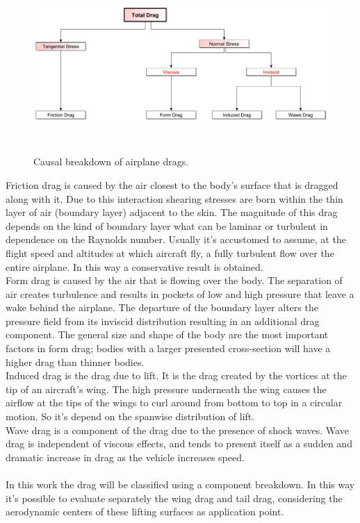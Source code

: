 \begin{figure}[H]
\centering
{\includegraphics[height=6cm]{Immagini/dragcausal.pdf}} 
\caption{Causal breakdown of airplane drags.}
\end{figure}


Friction drag is caused by the air closest to the body’s surface that is dragged along with it. Due to this interaction shearing stresses are born within the thin layer of air (boundary layer) adjacent to the skin. The magnitude of this drag depends on the kind of boundary layer what can be laminar or turbulent in dependence on the Raynolds number. Usually it's accustomed to assume, at the flight speed and altitudes at which aircraft fly, a fully turbulent flow over the entire airplane. In this way a conservative result is obtained.\\
Form drag is caused by the air that is flowing over the body. The separation of air creates turbulence and results in pockets of low and high pressure that leave a wake behind the airplane. The departure of the boundary layer alters the pressure field from its inviscid distribution resulting in an additional drag component. The general size and shape of the body are the most important factors in form drag; bodies with a larger presented cross-section will have a higher drag than thinner bodies.\\
Induced drag is the drag due to lift. It is the drag created by the vortices at the tip of an aircraft's wing. The high pressure underneath the wing causes the airflow at the tips of the wings to curl around from bottom to top in a circular motion. So it's depend on the spanwise distribution of lift. \\
Wave drag is a component of the drag due to the presence of shock waves. Wave drag is independent of viscous effects, and tends to present itself as a sudden and dramatic increase in drag as the vehicle increases speed.
\\ \\ 
In this work the drag will be classified using a component breakdown. In this way it's possible to evaluate separately the wing drag and tail drag, considering the aerodynamic centers of these lifting surfaces as application point.

